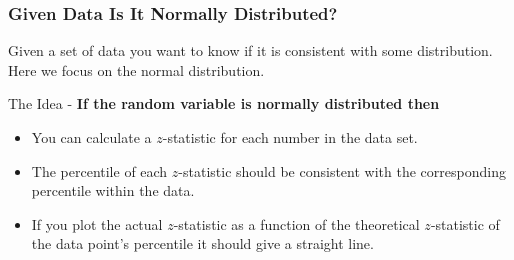 \begin{frame}
  \frametitle{Given Data Is It Normally Distributed?}

  Given a set of data you want to know if it is consistent with some
  distribution. Here we focus on the normal distribution. 

  The Idea - \textbf{If the random variable is normally distributed then}
  \begin{itemize}
  \item You can calculate a $z$-statistic for each number in the data
    set.
  \item The percentile of each $z$-statistic should be consistent with
    the corresponding percentile within the data.
  \item If you plot the actual $z$-statistic as a function of the
    theoretical $z$-statistic of the data point's percentile it should
    give a straight line.
  \end{itemize}
  
\end{frame}


